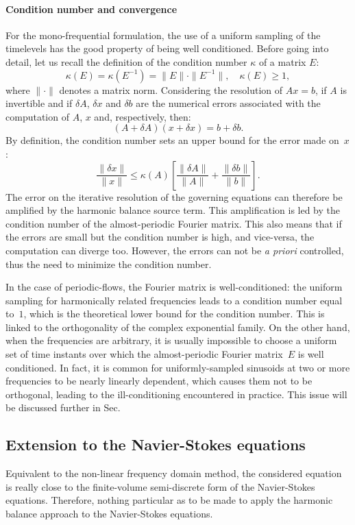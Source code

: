 \paragraph{Condition number and convergence}
For the mono-frequential formulation, the use of a uniform
sampling of the timelevels has the good property of being
well conditioned.
Before going into detail, let us recall the definition of the
condition number $\kappa$ of a matrix $E$:
\begin{equation}
	\kappa (E) = \kappa (E^{-1}) = \| E \| \cdot \| E^{-1} \|, \quad
    \kappa(E) \geq 1,
\end{equation}
where $\| \cdot \|$ denotes a matrix norm.  Considering the resolution
of $A x = b$, if $A$ is invertible and if $\delta A$, $\delta x$ and
$\delta b$ are the numerical errors associated with the computation of
$A$, $x$ and, respectively, then:
\begin{equation}
   (A + \delta A)(x + \delta x) = b + \delta b.
   \label{eq:error_reso}
\end{equation}
By definition, the condition number sets an upper bound for 
the error made on~$x$:
\begin{equation}
   \frac{\| \delta x \|}{\| x \|} \leq \kappa(A)\left[\frac{\| \delta A \|}{\| A \|} + \frac{\| \delta b \|}{\| b \|} \right].
   \label{eq:conditonnig_amp}
\end{equation}
The error on the iterative resolution of the governing equations can
therefore be amplified by the harmonic balance source term. 
This amplification is
led by the condition number of the almost-periodic Fourier matrix. This
also means that if the errors are small but the condition number is
high, and vice-versa, the computation can diverge too. However, the
errors can not be \emph{a priori} controlled, thus the need to
minimize the condition number.

In the case of periodic-flows, the Fourier matrix is well-conditioned: the
uniform sampling for harmonically related frequencies leads to a
condition number equal to~$1$, which is the theoretical lower bound
for the condition number.  This is linked to the orthogonality of the
complex exponential family.  On the other hand, when the frequencies are arbitrary, it is usually
impossible to choose a uniform set of time instants over which the
almost-periodic Fourier matrix~$E$ is well conditioned. In fact, it is common for uniformly-sampled
sinusoids at two or more frequencies to be nearly linearly dependent,
which causes them not to be orthogonal, leading to the
ill-conditioning encountered in practice. This issue will be discussed
further in Sec.

\subsection{Extension to the Navier-Stokes equations}
Equivalent to the non-linear frequency domain method, the
considered equation is really close to the finite-volume
semi-discrete form of the Navier-Stokes equations. Therefore,
nothing particular as to be made to apply the harmonic balance approach
to the Navier-Stokes equations.